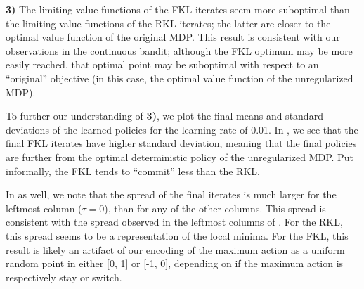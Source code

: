 \documentclass[twoside,11pt]{article}
\begin{document}
\textbf{3)} The limiting value functions of the FKL iterates seem more suboptimal than the limiting value functions of the RKL iterates; the latter are closer to the optimal value function of the original MDP. This result is consistent with our observations in the continuous bandit; although the FKL optimum may be more easily reached, that optimal point may be suboptimal with respect to an ``original'' objective (in this case, the optimal value function of the unregularized MDP). 

To further our understanding of \textbf{3)}, we plot the final means and standard deviations of the learned policies for the learning rate of 0.01. In , we see that the final FKL iterates have higher standard deviation, meaning that the final policies are further from the optimal deterministic policy of the unregularized MDP. Put informally, the FKL tends to ``commit'' less than the RKL.  

In  as well, we note that the spread of the final iterates is much larger for the leftmost column ($\tau = 0$), than for any of the other columns. This spread is consistent with the spread observed in the leftmost columns of . For the RKL, this spread seems to be a representation of the local minima. For the FKL, this result is likely an artifact of our encoding of the maximum action as a uniform random point in either [0, 1] or [-1, 0], depending on if the maximum action is respectively stay or switch. 
\end{document}
